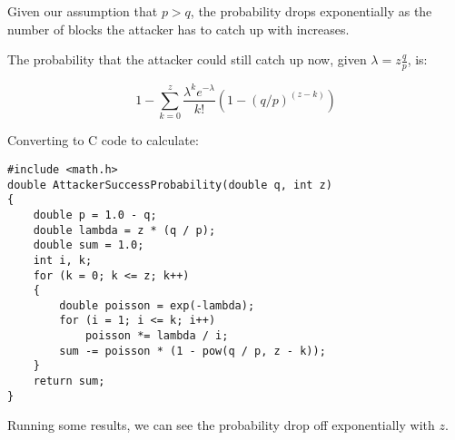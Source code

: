 Given our assumption that \( p > q \), the probability drops exponentially as the number of blocks the attacker has to catch up with increases.

The probability that the attacker could still catch up now, given \( \lambda = z \frac{q}{p} \), is:

\[
1 - \sum_{k=0}^{z} \frac{\lambda^k e^{-\lambda}}{k!} \left(1-(q/p)^{(z-k)}\right)
\]

Converting to C code to calculate:

\begin{verbatim}
#include <math.h>
double AttackerSuccessProbability(double q, int z)
{
    double p = 1.0 - q;
    double lambda = z * (q / p);
    double sum = 1.0;
    int i, k;
    for (k = 0; k <= z; k++)
    {
        double poisson = exp(-lambda);
        for (i = 1; i <= k; i++)
            poisson *= lambda / i;
        sum -= poisson * (1 - pow(q / p, z - k));
    }
    return sum;
}
\end{verbatim}

Running some results, we can see the probability drop off exponentially with \( z \).